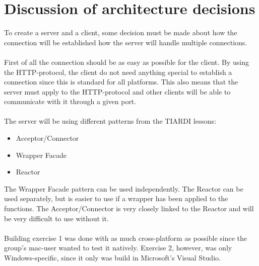 \documentclass[Main]{subfiles}
\begin{document}
\section{Discussion of architecture decisions}

To create a server and a client, some decision must be made about how the connection will be established how the server will handle multiple connections.
\\
\\
First of all the connection should be as easy as possible for the client. 
By using the HTTP-protocol, the client do not need anything special to establish a connection since this is standard for all platforms.
This also means that the server must apply to the HTTP-protocol and other clients will be able to communicate with it through a given port.
\\
\\
The server will be using different patterns from the TIARDI lessons:
\begin{itemize}
	\item Acceptor/Connector
	\item Wrapper Facade
	\item Reactor
\end{itemize}
The Wrapper Facade pattern can be used independently.
The Reactor can be used separately, but is easier to use if a wrapper has been applied to the functions. 
The Acceptor/Connector is very closely linked to the Reactor and will be very difficult to use without it.
\\
\\
Building exercise 1 was done with as much cross-platform as possible since the group's mac-user wanted to test it natively. 
Exercise 2, however, was only Windows-specific, since it only was build in Microsoft's Visual Studio.	
\end{document}

